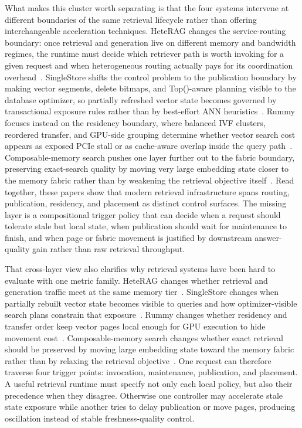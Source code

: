 \documentclass[acmsmall,screen,review]{acmart}
\begin{document}
What makes this cluster worth separating is that the four systems intervene at different boundaries of the same retrieval lifecycle rather than offering interchangeable acceleration techniques. HeteRAG changes the service-routing boundary: once retrieval and generation live on different memory and bandwidth regimes, the runtime must decide which retriever path is worth invoking for a given request and when heterogeneous routing actually pays for its coordination overhead~\cite{liu2025heterrag}. SingleStore shifts the control problem to the publication boundary by making vector segments, delete bitmaps, and Top()-aware planning visible to the database optimizer, so partially refreshed vector state becomes governed by transactional exposure rules rather than by best-effort ANN heuristics~\cite{chen2024singlestorev}. Rummy focuses instead on the residency boundary, where balanced IVF clusters, reordered transfer, and GPU-side grouping determine whether vector search cost appears as exposed PCIe stall or as cache-aware overlap inside the query path~\cite{zhang2024rummy}. Composable-memory search pushes one layer further out to the fabric boundary, preserving exact-search quality by moving very large embedding state closer to the memory fabric rather than by weakening the retrieval objective itself~\cite{quinn2025accelerating}. Read together, these papers show that modern retrieval infrastructure spans routing, publication, residency, and placement as distinct control surfaces. The missing layer is a compositional trigger policy that can decide when a request should tolerate stale but local state, when publication should wait for maintenance to finish, and when page or fabric movement is justified by downstream answer-quality gain rather than raw retrieval throughput.

That cross-layer view also clarifies why retrieval systems have been hard to evaluate with one metric family. HeteRAG changes whether retrieval and generation traffic meet at the same memory tier~\cite{liu2025heterrag}. SingleStore changes when partially rebuilt vector state becomes visible to queries and how optimizer-visible search plans constrain that exposure~\cite{chen2024singlestorev}. Rummy changes whether residency and transfer order keep vector pages local enough for GPU execution to hide movement cost~\cite{zhang2024rummy}. Composable-memory search changes whether exact retrieval should be preserved by moving large embedding state toward the memory fabric rather than by relaxing the retrieval objective~\cite{quinn2025accelerating}. One request can therefore traverse four trigger points: invocation, maintenance, publication, and placement. A useful retrieval runtime must specify not only each local policy, but also their precedence when they disagree. Otherwise one controller may accelerate stale state exposure while another tries to delay publication or move pages, producing oscillation instead of stable freshness-quality control.
\end{document}

